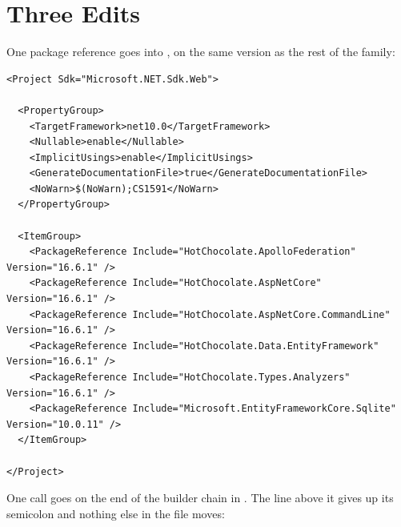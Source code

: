 \section{Three Edits}
\label{sec:ch06-three-edits}

%
One package reference goes into , on the same version as
the rest of the family:

\begin{verbatim}
<Project Sdk="Microsoft.NET.Sdk.Web">

  <PropertyGroup>
    <TargetFramework>net10.0</TargetFramework>
    <Nullable>enable</Nullable>
    <ImplicitUsings>enable</ImplicitUsings>
    <GenerateDocumentationFile>true</GenerateDocumentationFile>
    <NoWarn>$(NoWarn);CS1591</NoWarn>
  </PropertyGroup>

  <ItemGroup>
    <PackageReference Include="HotChocolate.ApolloFederation" Version="16.6.1" />
    <PackageReference Include="HotChocolate.AspNetCore" Version="16.6.1" />
    <PackageReference Include="HotChocolate.AspNetCore.CommandLine" Version="16.6.1" />
    <PackageReference Include="HotChocolate.Data.EntityFramework" Version="16.6.1" />
    <PackageReference Include="HotChocolate.Types.Analyzers" Version="16.6.1" />
    <PackageReference Include="Microsoft.EntityFrameworkCore.Sqlite" Version="10.0.11" />
  </ItemGroup>

</Project>
\end{verbatim}

%
One call goes on the end of the builder chain in . The line
above it gives up its semicolon and nothing else in the file moves:

